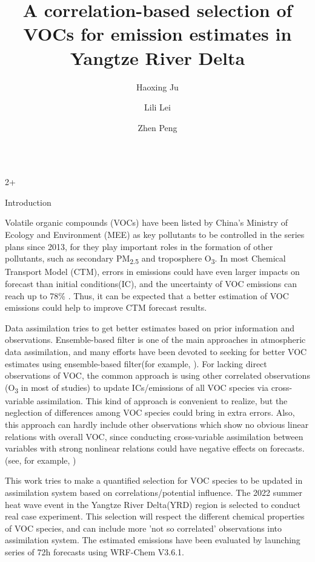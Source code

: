 \documentclass[final]{beamer}
\title{A correlation-based selection of VOCs for emission estimates in Yangtze River Delta}
\author{Haoxing Ju \inst{1} \and Lili Lei \inst{1} \and Zhen Peng \inst{1}}
\institute[shortinst]{\inst{1} School of Atmospheric Sciences, Nanjing University, Nanjing, China}
\newlength{\sepwidth}
\newlength{\colwidth}
\newlength{\sepparagraph}
\newcommand{\sepnewparagraph}{\vspace{\sepparagraph}}
\begin{document}
\begin{frame}[t]
	\begin{columns}
    	\begin{column}{2\colwidth+\sepwidth}
    	\begin{block}{Introduction}
    		
            Volatile organic compounds (VOCs) have been listed by China's Ministry of Ecology and Environment (MEE) as key pollutants to be controlled in the series plans since 2013, for they play important roles in 
            the formation of other pollutants, such as secondary PM\textsubscript{2.5} and troposphere O\textsubscript{3}. In most Chemical Transport Model (CTM), errors in emissions could have even larger impacts on forecast than initial conditions(IC)\parencite{Sandu_2011}, and the uncertainty of VOC emissions can reach up to 78\% \parencite{Li_2017}. Thus, it can be expected that a better estimation of VOC emissions could help to improve CTM forecast results. \\
            
            \sepnewparagraph
            
            Data assimilation tries to get better estimates based on prior information and observations. Ensemble-based filter is one of the main approaches in atmospheric data assimilation, and many efforts have been devoted to seeking for better VOC estimates using ensemble-based filter(for example, \parencite{Tang_2011, Ma_2019, Xing_2020}). For lacking direct observations of VOC, the common approach is using other correlated observations (O\textsubscript{3} in most of studies) to update ICs/emissions of all VOC species via cross-variable assimilation. This kind of approach is convenient to realize, but the neglection of differences among VOC species could bring in extra errors. Also, this approach can hardly include other observations which show no obvious linear relations with overall VOC, since conducting cross-variable assimilation between variables with strong nonlinear relations could have negative effects on forecasts. (see, for example, \parencite{Tang_2016}) \\

            \sepnewparagraph

            This work tries to make a quantified selection for VOC species to be updated in assimilation system based on correlations/potential influence. The 2022 summer heat wave event in the Yangtze River Delta(YRD) region is selected to conduct real case experiment. This selection will respect the different chemical properties of VOC species, and can include more 'not so correlated' observations into assimilation system. The estimated emissions have been evaluated by launching series of 72h forecasts using WRF-Chem V3.6.1.
    		

\end{block}
\end{column}
\end{columns}
\end{frame}
\end{document}
